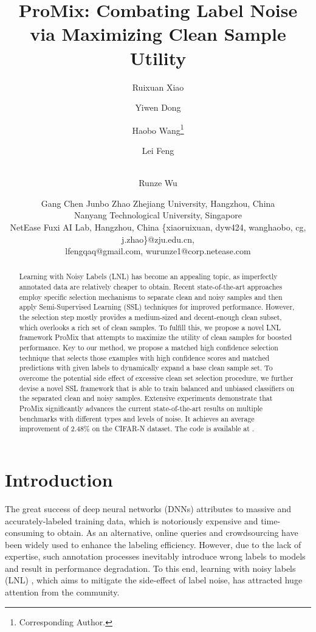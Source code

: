 \documentclass{article}
\title{ProMix: Combating Label Noise via Maximizing Clean Sample Utility}
\author{
Ruixuan Xiao\and
Yiwen Dong\and
Haobo Wang\footnote{Corresponding Author.}\and
Lei Feng\and \\ 
Runze Wu\and
Gang Chen\And
Junbo Zhao
\affiliations
Zhejiang University, Hangzhou, China \\ Nanyang Technological University, Singapore \\NetEase Fuxi AI Lab, Hangzhou, China
\emails
\{xiaoruixuan, dyw424, wanghaobo, cg, j.zhao\}@zju.edu.cn, \\lfengqaq@gmail.com, wurunze1@corp.netease.com
}
\begin{document}
\maketitle

\begin{abstract}
    Learning with Noisy Labels (LNL) has become an appealing topic, as imperfectly annotated data are relatively cheaper to obtain. Recent state-of-the-art approaches employ specific selection mechanisms to separate clean and noisy samples and then apply Semi-Supervised Learning (SSL) techniques for improved performance. However, the selection step mostly provides a medium-sized and decent-enough clean subset, which overlooks a rich set of clean samples. To fulfill this, we propose a novel LNL framework ProMix that attempts to maximize the utility of clean samples for boosted performance. Key to our method, we propose a matched high confidence selection technique that selects those examples with high confidence scores and matched predictions with given labels to dynamically expand a base clean sample set. To overcome the potential side effect of excessive clean set selection procedure, we further devise a novel SSL framework that is able to train balanced and unbiased classifiers on the separated clean and noisy samples. Extensive experiments demonstrate that ProMix significantly advances the current state-of-the-art results on multiple benchmarks with different types and levels of noise. It achieves an average improvement of 2.48\% on the CIFAR-N dataset. The code is available at \href{https://github.com/Justherozen/ProMix}{\color{brilliantrose}{https://github.com/Justherozen/ProMix}}.
\end{abstract}

\section{Introduction}
The great success of deep neural networks (DNNs) attributes to massive and accurately-labeled training data, which is notoriously expensive and time-consuming to obtain. As an alternative, online queries \cite{DBLP:journals/jacm/BlumKW03} and crowdsourcing \cite{DBLP:journals/ml/YanRFRD14} have been widely used to enhance the labeling efficiency. However, due to the lack of expertise, such annotation processes inevitably introduce wrong labels to models and result in performance degradation. To this end, learning with noisy labels (LNL) \cite{DBLP:conf/iclr/ZhangBHRV17}, which aims to mitigate the side-effect of label noise, has attracted huge attention from the community.
\end{document}
